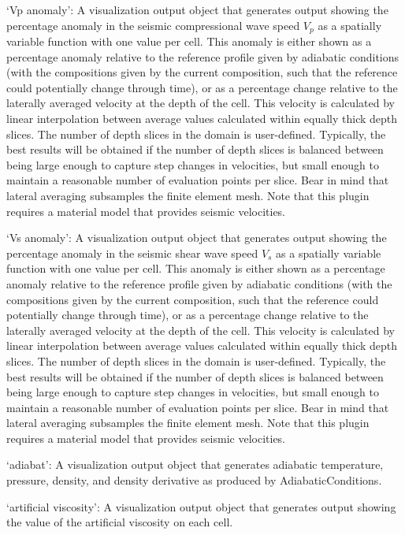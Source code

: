 \begin{itemize}
`Vp anomaly': A visualization output object that generates output showing the percentage anomaly in the seismic compressional wave speed $V_p$ as a spatially variable function with one value per cell. This anomaly is either shown as a percentage anomaly relative to the reference profile given by adiabatic conditions (with the compositions given by the current composition, such that the reference could potentially change through time), or as a percentage change relative to the laterally averaged velocity at the depth of the cell. This velocity is calculated by linear interpolation between average values calculated within equally thick depth slices. The number of depth slices in the domain is user-defined. Typically, the best results will be obtained if the number of depth slices is balanced between being large enough to capture step changes in velocities, but small enough to maintain a reasonable number of evaluation points per slice. Bear in mind that lateral averaging subsamples the finite element mesh. Note that this plugin requires a material model that provides seismic velocities.

`Vs anomaly': A visualization output object that generates output showing the percentage anomaly in the seismic shear wave speed $V_s$ as a spatially variable function with one value per cell. This anomaly is either shown as a percentage anomaly relative to the reference profile given by adiabatic conditions (with the compositions given by the current composition, such that the reference could potentially change through time), or as a percentage change relative to the laterally averaged velocity at the depth of the cell. This velocity is calculated by linear interpolation between average values calculated within equally thick depth slices. The number of depth slices in the domain is user-defined. Typically, the best results will be obtained if the number of depth slices is balanced between being large enough to capture step changes in velocities, but small enough to maintain a reasonable number of evaluation points per slice. Bear in mind that lateral averaging subsamples the finite element mesh. Note that this plugin requires a material model that provides seismic velocities.

`adiabat': A visualization output object that generates adiabatic temperature, pressure, density, and density derivative as produced by AdiabaticConditions.

`artificial viscosity': A visualization output object that generates output showing the value of the artificial viscosity on each cell.


\end{itemize}
